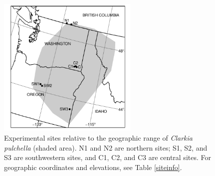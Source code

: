 \documentclass{article}
\begin{document}
\begin{figure}[p]
\centering
\includegraphics[width = 0.6\textwidth]{figs/map}
\caption{Experimental sites relative to the geographic range of \textit{Clarkia pulchella} (shaded area). N1 and N2 are northern sites; S1, S2, and S3 are southwestern sites, and C1, C2, and C3 are central sites. For geographic coordinates and elevations, see Table \ref{siteinfo}.}
\label{map}
\end{figure}


\clearpage
\end{document}
